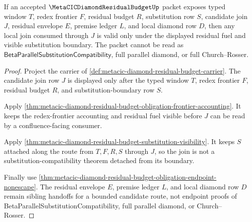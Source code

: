 \begin{theorem}
\label{thm:metacic-diamond-residual-budget-local-join}
If an accepted $\MetaCICDiamondResidualBudgetUp$ packet exposes typed window $T$, redex frontier $F$, residual budget $R$, substitution row $S$, candidate join $J$, residual envelope $E$, premise ledger $L$, and local diamond row $D$, then any local join consumed through $J$ is valid only under the displayed residual fuel and visible substitution boundary. The packet cannot be read as $\mathsf{BetaParallelSubstitutionCompatibility}$, full parallel diamond, or full Church--Rosser.
\end{theorem}
\begin{proof}
Project the carrier of \autoref{def:metacic-diamond-residual-budget-carrier}. The candidate join row $J$ is displayed only after the typed window $T$, redex frontier $F$, residual budget $R$, and substitution-boundary row $S$.

Apply \autoref{thm:metacic-diamond-residual-budget-obligation-frontier-accounting}. It keeps the redex-frontier accounting and residual fuel visible before $J$ can be read by a confluence-facing consumer.

Apply \autoref{thm:metacic-diamond-residual-budget-substitution-visibility}. It keeps $S$ attached along the route from $T,F,R,S$ through $J$, so the join is not a substitution-compatibility theorem detached from its boundary.

Finally use \autoref{thm:metacic-diamond-residual-budget-obligation-endpoint-nonescape}. The residual envelope $E$, premise ledger $L$, and local diamond row $D$ remain sibling handoffs for a bounded candidate route, not endpoint proofs of BetaParallelSubstitutionCompatibility, full parallel diamond, or Church--Rosser.
\end{proof}

